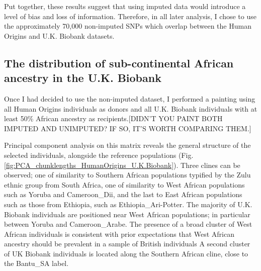 Put together, these results suggest that using imputed data would introduce a level of bias and loss of information. Therefore, in all later analysis, I chose to use the approximately 70,000 non-imputed SNPs which overlap between the Human Origins and U.K. Biobank datasets. 

\subsection{The distribution of sub-continental African ancestry in the U.K. Biobank}

Once I had decided to use the non-imputed dataset, I performed a painting using all Human Origins individuals as donors and all U.K. Biobank individuals with at least 50\% African ancestry as recipients.{\color{red}[DIDN'T YOU PAINT BOTH IMPUTED AND UNIMPUTED? IF SO, IT'S WORTH COMPARING THEM.]} 

Principal component analysis on this matrix reveals the general structure of the selected individuals, alongside the reference populations (Fig. \ref{fig:PCA_chunklengths_HumanOrigins_U.K.Biobank}). Three clines can be observed; one of similarity to Southern African populations typified by the Zulu ethnic group from South Africa, one of similarity to West African populations such as Yoruba and Cameroon\_Dii, and the last to East African populations such as those from Ethiopia, such as Ethiopia\_Ari-Potter. The majority of U.K. Biobank individuals are positioned near West African populations; in particular between Yoruba and Cameroon\_Arabe. The presence of a broad cluster of West African individuals is consistent with prior expectations that West African ancestry should be prevalent in a sample of British individuals A second cluster of UK Biobank individuals is located along the Southern African cline, close to the Bantu\_SA label. 

